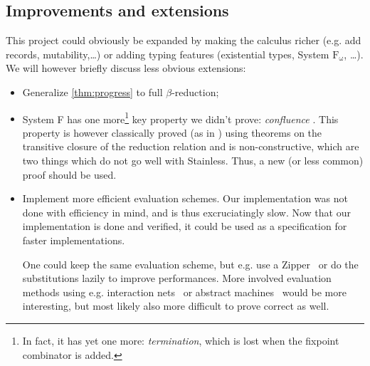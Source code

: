 \subsection{Improvements and extensions}

This project could obviously be expanded by making the calculus richer (e.g. add records, mutability,\ldots) or adding typing features (existential types, System $\mathrm{F_\omega}$, \ldots).
We will however briefly discuss less obvious extensions:
\begin{itemize}
    \item Generalize \cref{thm:progress} to full $\beta$-reduction;
    \item System F has one more\footnote{In fact, it has yet one more: \emph{termination}, which is lost when the fixpoint combinator is added.} key property we didn't prove: \emph{confluence} \cite{trallthat}. 
    This property is however classically proved (as in \cite{confluenceProof}) using theorems on the transitive closure of the reduction relation and is non-constructive, which are two things which do not go well with Stainless. 
    Thus, a new (or less common) proof should be used.
    \item Implement more efficient evaluation schemes.
    Our implementation was not done with efficiency in mind, and is thus excruciatingly slow.
    Now that our implementation is done and verified, it could be used as a specification for faster implementations.
    
    One could keep the same evaluation scheme, but e.g. use a Zipper~\cite{huetZipper} or do the substitutions lazily to improve performances.
    More involved evaluation methods using e.g. interaction nets~\cite{interactionNet} or abstract machines~\cite{abstractMachines} would be more interesting, but most likely also more difficult to prove correct as well.
\end{itemize}